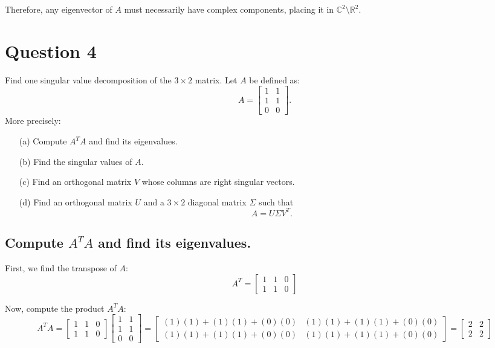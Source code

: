 Therefore, any eigenvector of $A$ must necessarily have complex components, placing it in $\mathbb{C}^2 \setminus \mathbb{R}^2$.

\section{Question 4}
Find one singular value decomposition of the $3 \times 2$ matrix. Let $A$ be defined as:
\[ A = \begin{bmatrix} 1 & 1 \\ 1 & 1 \\ 0 & 0 \end{bmatrix}. \]
More precisely:
\begin{enumerate}
	\item[(a)] Compute $A^T A$ and find its eigenvalues.
	\item[(b)] Find the singular values of $A$.
	\item[(c)] Find an orthogonal matrix $V$ whose columns are right singular vectors.
	\item[(d)] Find an orthogonal matrix $U$ and a $3 \times 2$ diagonal matrix $\Sigma$ such that \[ A = U\Sigma V^T. \]
\end{enumerate}
\subsection{Compute $A^T A$ and find its eigenvalues.}
First, we find the transpose of $A$:
\[
	A^T = \begin{bmatrix} 1 & 1 & 0 \\ 1 & 1 & 0 \end{bmatrix}
\]

Now, compute the product $A^T A$:
\[
	A^T A = \begin{bmatrix} 1 & 1 & 0 \\ 1 & 1 & 0 \end{bmatrix} \begin{bmatrix} 1 & 1 \\ 1 & 1 \\ 0 & 0 \end{bmatrix} = \begin{bmatrix} (1)(1)+(1)(1)+(0)(0) & (1)(1)+(1)(1)+(0)(0) \\ (1)(1)+(1)(1)+(0)(0) & (1)(1)+(1)(1)+(0)(0) \end{bmatrix} = \begin{bmatrix} 2 & 2 \\ 2 & 2 \end{bmatrix}
\]

